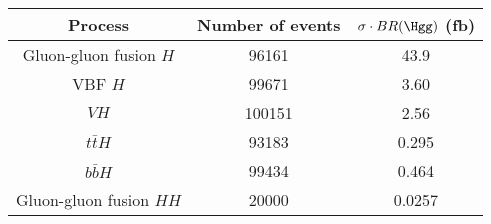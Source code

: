 \begin{tabular}{|c|c|c|}
\hline
Process & Number of events & $\sigma \cdot BR(\Hgg)$ (fb) \\
\hline
Gluon-gluon fusion $H$ & 96161 & 43.9 \\
VBF $H$ & 99671 & 3.60 \\
$VH$ & 100151 & 2.56 \\
$t\bar{t}H$ & 93183 & 0.295 \\
$b\bar{b}H$ & 99434 & 0.464 \\
Gluon-gluon fusion $HH$ & 20000 & 0.0257 \\
\hline
\end{tabular}
